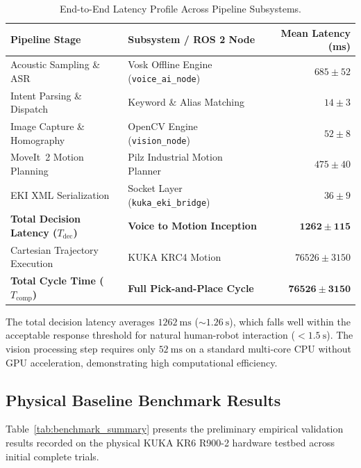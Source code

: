 \documentclass[runningheads]{llncs}
\begin{document}
\begin{table}[tb]
\caption{End-to-End Latency Profile Across Pipeline Subsystems.}
\label{tab:latency_breakdown}
\centering
\begin{tabular}{llr}
\toprule
\textbf{Pipeline Stage} & \textbf{Subsystem / ROS 2 Node} & \textbf{Mean Latency (ms)} \\
\midrule
Acoustic Sampling \& ASR & Vosk Offline Engine (\texttt{voice\_ai\_node}) & $685 \pm 52$ \\
Intent Parsing \& Dispatch & Keyword \& Alias Matching & $14 \pm 3$ \\
Image Capture \& Homography & OpenCV Engine (\texttt{vision\_node}) & $52 \pm 8$ \\
MoveIt~2 Motion Planning & Pilz Industrial Motion Planner & $475 \pm 40$ \\
EKI XML Serialization & Socket Layer (\texttt{kuka\_eki\_bridge}) & $36 \pm 9$ \\
\midrule
\textbf{Total Decision Latency ($T_{\text{dec}}$)} & \textbf{Voice to Motion Inception} & $\mathbf{1262 \pm 115}$ \\
Cartesian Trajectory Execution & KUKA KRC4 Motion & $76526 \pm 3150$ \\
\midrule
\textbf{Total Cycle Time ($T_{\text{comp}}$)} & \textbf{Full Pick-and-Place Cycle} & $\mathbf{76526 \pm 3150}$ \\
\bottomrule
\end{tabular}
\end{table}

The total decision latency averages $\SI{1262}{\milli\second}$ ($\sim\SI{1.26}{\second}$), which falls well within the acceptable response threshold for natural human-robot interaction ($<\SI{1.5}{\second}$). The vision processing step requires only $\SI{52}{\milli\second}$ on a standard multi-core CPU without GPU acceleration, demonstrating high computational efficiency.

\subsection{Physical Baseline Benchmark Results}
Table~\ref{tab:benchmark_summary} presents the preliminary empirical validation results recorded on the physical KUKA KR6 R900-2 hardware testbed across initial complete trials.
\end{document}
